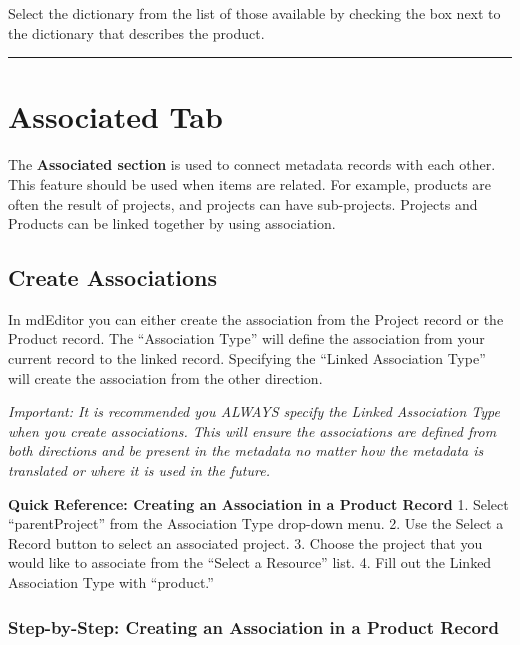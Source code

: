\documentclass[
]{book}
\begin{document}
Select the dictionary from the list of those available by checking the box next to the dictionary that describes the product.

\begin{center}\rule{0.5\linewidth}{\linethickness}\end{center}

\hypertarget{product-associated}{%
\section{Associated Tab}\label{product-associated}}

The \textbf{Associated section} is used to connect metadata records with each other. This feature should be used when items are related. For example, products are often the result of projects, and projects can have sub-projects. Projects and Products can be linked together by using association.

\hypertarget{create-associations-1}{%
\subsection{Create Associations}\label{create-associations-1}}

In mdEditor you can either create the association from the Project record or the Product record. The ``Association Type'' will define the association from your current record to the linked record. Specifying the ``Linked Association Type'' will create the association from the other direction.

\emph{Important: It is recommended you ALWAYS specify the Linked Association Type when you create associations. This will ensure the associations are defined from both directions and be present in the metadata no matter how the metadata is translated or where it is used in the future.}

\textbf{Quick Reference: Creating an Association in a Product Record}
1. Select ``parentProject'' from the Association Type drop-down menu.
2. Use the Select a Record button to select an associated project.
3. Choose the project that you would like to associate from the ``Select a Resource'' list.
4. Fill out the Linked Association Type with ``product.''

\hypertarget{step-by-step-creating-an-association-in-a-product-record}{%
\subsubsection{Step-by-Step: Creating an Association in a Product Record}\label{step-by-step-creating-an-association-in-a-product-record}}
\end{document}
